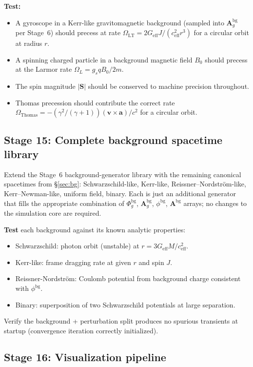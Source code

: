 \documentclass[11pt,a4paper]{article}
\newcommand{\vv}[1]{\mathbf{#1}}
\newcommand{\Phig}{\Phi_g}
\newcommand{\Ag}{\vv{A}_g}
\begin{document}
\textbf{Test:}
\begin{itemize}
  \item A gyroscope in a Kerr-like gravitomagnetic background (sampled into $\Ag^{\mathrm{bg}}$ per Stage~6) should precess at rate $\Omega_{\mathrm{LT}} = 2G_{\mathrm{eff}}J/(c_{\mathrm{eff}}^2 r^3)$ for a circular orbit at radius $r$.
  \item A spinning charged particle in a background magnetic field $B_0$ should precess at the Larmor rate $\Omega_L = g_s qB_0/2m$.
  \item The spin magnitude $|\vv{S}|$ should be conserved to machine precision throughout.
  \item Thomas precession should contribute the correct rate $\Omega_{\mathrm{Thomas}} = -(\gamma^2/(\gamma+1))(\vv{v}\times\vv{a})/c^2$ for a circular orbit.
\end{itemize}

\subsection{Stage 15: Complete background spacetime library}

Extend the Stage~6 background-generator library with the remaining canonical spacetimes from §\ref{sec:bg}: Schwarzschild-like, Kerr-like, Reissner--Nordstr\"om-like, Kerr--Newman-like, uniform field, binary.  Each is just an additional generator that fills the appropriate combination of $\Phig^{\mathrm{bg}}$, $\Ag^{\mathrm{bg}}$, $\phi^{\mathrm{bg}}$, $\vv{A}^{\mathrm{bg}}$ arrays; no changes to the simulation core are required.

\textbf{Test} each background against its known analytic properties:
\begin{itemize}
  \item Schwarzschild: photon orbit (unstable) at $r = 3G_{\mathrm{eff}}M/c_{\mathrm{eff}}^2$.
  \item Kerr-like: frame dragging rate at given $r$ and spin $J$.
  \item Reissner-Nordström: Coulomb potential from background charge consistent with $\phi^{\mathrm{bg}}$.
  \item Binary: superposition of two Schwarzschild potentials at large separation.
\end{itemize}
Verify the background + perturbation split produces no spurious transients at startup (convergence iteration correctly initialized).

\subsection{Stage 16: Visualization pipeline}
\end{document}
